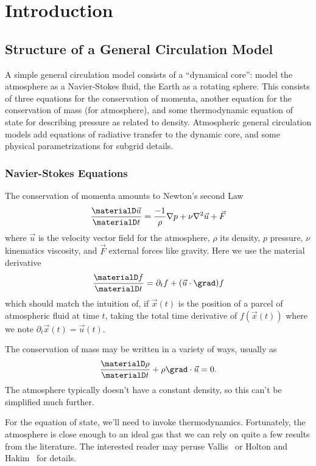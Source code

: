 \chapter{Introduction}

\section{Structure of a General Circulation Model}

A simple general circulation model consists of a ``dynamical core'':
model the atmosphere as a Navier-Stokes fluid, the Earth as a rotating
sphere. This consists of three equations for the conservation of
momenta, another equation for the conservation of mass (for atmosphere),
and some thermodynamic equation of state for describing pressure as
related to density. Atmospheric general circulation models add equations
of radiative transfer to the dynamic core, and some physical
parametrizations for subgrid details.

\subsection{Navier-Stokes Equations}

The conservation of momenta amounts to Newton's second Law
\begin{equation}
  \frac{\materialD\vec{u}}{\materialD t}
  =\frac{-1}{\rho}\nabla p + \nu\nabla^{2}\vec{u} + \vec{F}
\end{equation}
where $\vec{u}$ is the velocity vector field for the atmosphere, $\rho$
its density, $p$ pressure, $\nu$ kinematics viscosity, and $\vec{F}$
external forces like gravity. Here we use the material derivative
\begin{equation}
  \frac{\materialD f}{\materialD t} = \partial_{t}f + (\vec{u}\cdot\grad)f
\end{equation}
which should match the intuition of, if $\vec{x}(t)$ is the position of
a parcel of atmospheric fluid at time $t$, taking the total time
derivative of $f(\vec{x}(t))$ where we note
$\partial_{t}\vec{x}(t)=\vec{u}(t)$.

The conservation of mass may be written in a variety of ways, usually as
\begin{equation}
  \frac{\materialD\rho}{\materialD t}+\rho\grad\cdot\vec{u}=0.
\end{equation}
The atmosphere typically doesn't have a constant density, so this can't
be simplified much further.

For the equation of state, we'll need to invoke thermodynamics.
Fortunately, the atmosphere is close enough to an ideal gas that we can
rely on quite a few results from the literature. The interested reader
may peruse Vallis~\cite{vallis_2017} or Holton and
Hakim~\cite{holton2013dynamicMeteorology} for details.

